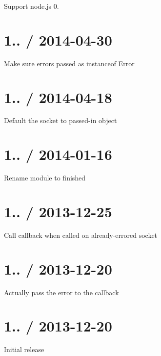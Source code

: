 \begin{DoxyItemize}
\item Support node.\+js 0.
\end{DoxyItemize}

\section*{1.. / 2014-\/04-\/30 }


\begin{DoxyItemize}
\item Make sure errors passed as instanceof {\ttfamily Error}
\end{DoxyItemize}

\section*{1.. / 2014-\/04-\/18 }


\begin{DoxyItemize}
\item Default the {\ttfamily socket} to passed-\/in object
\end{DoxyItemize}

\section*{1.. / 2014-\/01-\/16 }


\begin{DoxyItemize}
\item Rename module to {\ttfamily finished}
\end{DoxyItemize}

\section*{1.. / 2013-\/12-\/25 }


\begin{DoxyItemize}
\item Call callback when called on already-\/errored socket
\end{DoxyItemize}

\section*{1.. / 2013-\/12-\/20 }


\begin{DoxyItemize}
\item Actually pass the error to the callback
\end{DoxyItemize}

\section*{1.. / 2013-\/12-\/20 }


\begin{DoxyItemize}
\item Initial release 
\end{DoxyItemize}